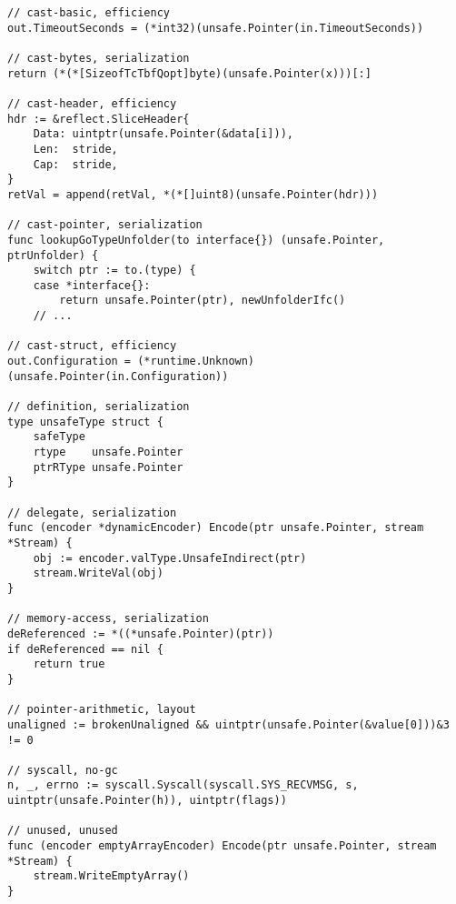 \begin{lstlisting}[language=Golang, label=lst:dataset-label-class-examples, caption=Example code snippets for different classes in the data set]
// cast-basic, efficiency
out.TimeoutSeconds = (*int32)(unsafe.Pointer(in.TimeoutSeconds))

// cast-bytes, serialization
return (*(*[SizeofTcTbfQopt]byte)(unsafe.Pointer(x)))[:]

// cast-header, efficiency
hdr := &reflect.SliceHeader{
    Data: uintptr(unsafe.Pointer(&data[i])),
    Len:  stride,
    Cap:  stride,
}
retVal = append(retVal, *(*[]uint8)(unsafe.Pointer(hdr)))

// cast-pointer, serialization
func lookupGoTypeUnfolder(to interface{}) (unsafe.Pointer, ptrUnfolder) {
    switch ptr := to.(type) {
    case *interface{}:
        return unsafe.Pointer(ptr), newUnfolderIfc()
    // ...

// cast-struct, efficiency
out.Configuration = (*runtime.Unknown)(unsafe.Pointer(in.Configuration))

// definition, serialization
type unsafeType struct {
    safeType
    rtype    unsafe.Pointer
    ptrRType unsafe.Pointer
}

// delegate, serialization
func (encoder *dynamicEncoder) Encode(ptr unsafe.Pointer, stream *Stream) {
    obj := encoder.valType.UnsafeIndirect(ptr)
    stream.WriteVal(obj)
}

// memory-access, serialization
deReferenced := *((*unsafe.Pointer)(ptr))
if deReferenced == nil {
    return true
}

// pointer-arithmetic, layout
unaligned := brokenUnaligned && uintptr(unsafe.Pointer(&value[0]))&3 != 0

// syscall, no-gc
n, _, errno := syscall.Syscall(syscall.SYS_RECVMSG, s, uintptr(unsafe.Pointer(h)), uintptr(flags))

// unused, unused
func (encoder emptyArrayEncoder) Encode(ptr unsafe.Pointer, stream *Stream) {
    stream.WriteEmptyArray()
}
\end{lstlisting}